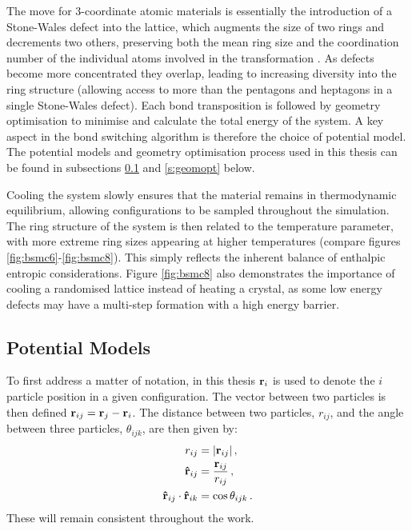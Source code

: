 The \mc{} move for 3\--coordinate atomic materials is essentially the introduction of a Stone\--Wales defect into the lattice, which
augments the size of two rings and decrements two others, preserving both the mean ring size and the coordination number of the individual atoms involved in the transformation \cite{Stone1986}.
As defects become more concentrated they overlap, leading to increasing diversity into the ring structure (allowing access to more than the pentagons and heptagons in a single Stone\--Wales defect).
Each bond transposition is followed by geometry optimisation to minimise and calculate the total energy of the system.  
A key aspect in the bond switching algorithm is therefore the choice of potential model.
The potential models and geometry optimisation process used in this thesis can be found in subsections \ref{s:potentials} and \ref{s:geomopt} below.

Cooling the system slowly ensures that the material remains in thermodynamic equilibrium, allowing configurations to be sampled throughout the simulation.
The ring structure of the system is then related to the temperature parameter, with more extreme ring sizes appearing at higher temperatures (compare figures \ref{fig:bsmc6}\--\ref{fig:bsmc8}).
This simply reflects the inherent balance of enthalpic \vs{} entropic  considerations.
Figure \ref{fig:bsmc8} also demonstrates the importance of cooling a randomised lattice instead of heating a crystal, as some low energy defects may have a multi\--step formation with a high energy barrier.  

\subsection{Potential Models}
\label{s:potentials}

To first address a matter of notation, in this thesis $\mathbf{r}_{i}$ is used to denote the $i$\th{} particle position in a given configuration.
The vector between two particles is then defined $\mathbf{r}_{ij}=\mathbf{r}_{j}-\mathbf{r}_{i}$.
The distance between two particles, $r_{ij}$, and the angle between three particles, $\theta_{ijk}$, are then given by:
\begin{align}
	r_{ij} &= \lvert\mathbf{r}_{ij}\rvert\,, \\
	\boldsymbol{\hat{\mathbf{r}}}_{ij} &= \frac{\mathbf{r}_{ij}}{r_{ij}}\,, \\
	\boldsymbol{\hat{\mathbf{r}}}_{ij} \cdot \boldsymbol{\hat{\mathbf{r}}}_{ik}&=\cos\theta_{ijk}\,.
\end{align}
These will remain consistent throughout the work.


